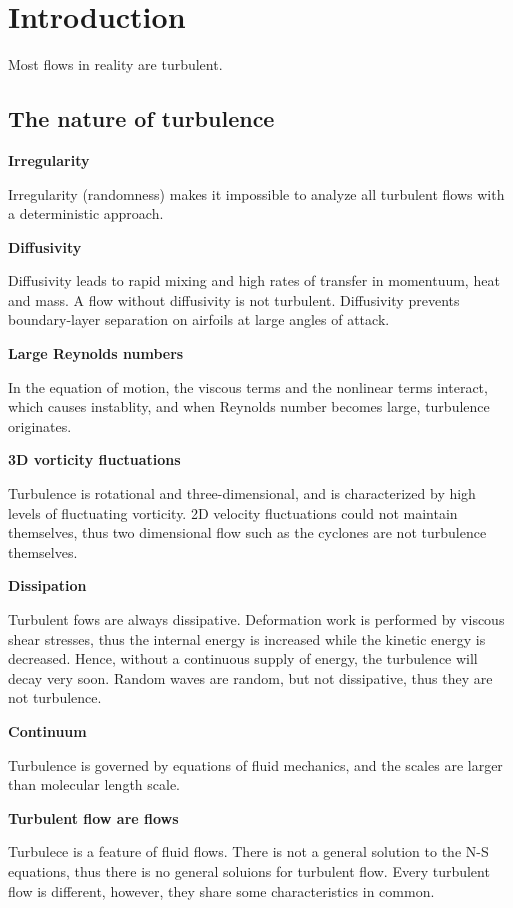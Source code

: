\section{Introduction}

Most flows in reality are turbulent.

\subsection{The nature of turbulence}

\textbf{Irregularity}

Irregularity (randomness) makes it impossible to analyze all turbulent flows with a deterministic approach.

\textbf{Diffusivity}

Diffusivity leads to rapid mixing and high rates of transfer in momentuum, heat and mass. A flow without diffusivity is not turbulent.
Diffusivity prevents boundary-layer separation on airfoils at large angles of attack.

\textbf{Large Reynolds numbers}

In the equation of motion, the viscous terms and the nonlinear terms interact, which causes instablity, and when Reynolds number becomes large, turbulence originates.

\textbf{3D vorticity fluctuations}

Turbulence is rotational and three-dimensional, and is characterized by high levels of fluctuating vorticity. 
2D velocity fluctuations could not maintain themselves, thus two dimensional flow such as the cyclones are not turbulence themselves.

\textbf{Dissipation}

Turbulent fows are always dissipative. Deformation work is performed by viscous shear stresses, thus the internal energy is increased while the kinetic energy is decreased.
Hence, without a continuous supply of energy, the turbulence will decay very soon.
Random waves are random, but not dissipative, thus they are not turbulence.

\textbf{Continuum}

Turbulence is governed by equations of fluid mechanics, and the scales are larger than molecular length scale.

\textbf{Turbulent flow are flows}

Turbulece is a feature of fluid flows. There is not a general solution to the N-S equations, thus there is no general soluions for turbulent flow.
Every turbulent flow is different, however, they share some characteristics in common.

